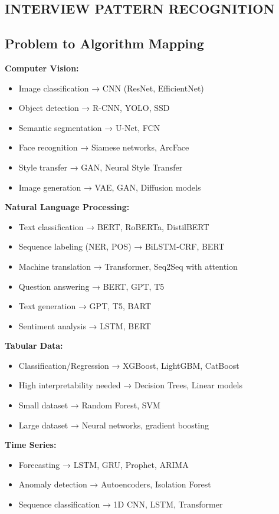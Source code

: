 \documentclass[8pt,landscape]{article}
\begin{document}
\begin{multicols}{3}
\section*{INTERVIEW PATTERN RECOGNITION}

\subsection*{Problem to Algorithm Mapping}

\textbf{Computer Vision:}
\begin{itemize}
\item Image classification → CNN (ResNet, EfficientNet)
\item Object detection → R-CNN, YOLO, SSD
\item Semantic segmentation → U-Net, FCN
\item Face recognition → Siamese networks, ArcFace
\item Style transfer → GAN, Neural Style Transfer
\item Image generation → VAE, GAN, Diffusion models
\end{itemize}

\textbf{Natural Language Processing:}
\begin{itemize}
\item Text classification → BERT, RoBERTa, DistilBERT
\item Sequence labeling (NER, POS) → BiLSTM-CRF, BERT
\item Machine translation → Transformer, Seq2Seq with attention
\item Question answering → BERT, GPT, T5
\item Text generation → GPT, T5, BART
\item Sentiment analysis → LSTM, BERT
\end{itemize}

\textbf{Tabular Data:}
\begin{itemize}
\item Classification/Regression → XGBoost, LightGBM, CatBoost
\item High interpretability needed → Decision Trees, Linear models
\item Small dataset → Random Forest, SVM
\item Large dataset → Neural networks, gradient boosting
\end{itemize}

\textbf{Time Series:}
\begin{itemize}
\item Forecasting → LSTM, GRU, Prophet, ARIMA
\item Anomaly detection → Autoencoders, Isolation Forest
\item Sequence classification → 1D CNN, LSTM, Transformer
\end{itemize}


\end{multicols}
\end{document}
